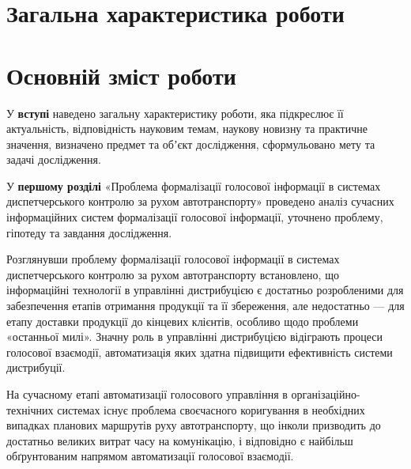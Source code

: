 

\section*{Загальна характеристика роботи}




\section*{Основній зміст роботи}
У \textbf{вступі} наведено загальну характеристику роботи, яка підкреслює її
актуальність, відповідність науковим темам, наукову новизну та практичне
значення, визначено предмет та обʼєкт дослідження, сформульовано мету та задачі
дослідження.

У \textbf{першому розділі} «Проблема формалізації голосової інформації в системах диспетчерського контролю за рухом автотранспорту» проведено аналіз сучасних інформаційних систем формалізації голосової інформації, уточнено проблему, гіпотеду та завдання дослідження. 

Розглянувши проблему формалізації голосової інформації в системах диспетчерського контролю за рухом автотранспорту встановлено, що інформаційні технології в управлінні дистрибуцією є достатньо розробленими для забезпечення етапів отримання продукції та її збереження, але недостатньо --- для етапу доставки продукції до кінцевих клієнтів, особливо щодо проблеми «останньої милі». Значну роль в управлінні дистрибуцією відіграють процеси голосової взаємодії, автоматизація яких здатна підвищити ефективність системи дистрибуції.

На сучасному етапі автоматизації голосового управління в організаційно-технічних системах існує проблема своєчасного коригування в необхідних випадках планових маршрутів руху автотранспорту, що інколи призводить до достатньо великих витрат часу на комунікацію, і відповідно є найбільш обґрунтованим напрямом автоматизації голосової взаємодії.

